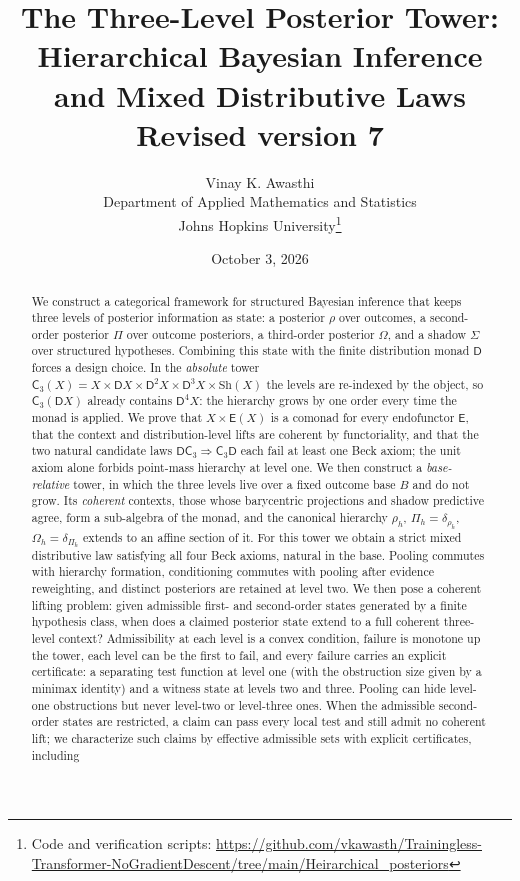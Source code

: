 \documentclass[11pt]{article}
\title{The Three-Level Posterior Tower:\\
Hierarchical Bayesian Inference and Mixed Distributive Laws\\[4pt]
\large Revised version 7}
\author{Vinay K. Awasthi\\
Department of Applied Mathematics and Statistics\\
Johns Hopkins University\thanks{Code and verification scripts:
\url{https://github.com/vkawasth/Trainingless-Transformer-NoGradientDescent/tree/main/Heirarchical_posteriors}}}
\date{October 3, 2026}
\theoremstyle{definition}
\theoremstyle{remark}
\newcommand{\D}{\mathsf{D}}
\newcommand{\Sh}{\mathrm{Sh}}
\newcommand{\C}{\mathsf{C}}
\newcommand{\E}{\mathsf{E}}
\begin{document}
\maketitle

\begin{abstract}
We construct a categorical framework for structured Bayesian inference that keeps three levels of
posterior information as state: a posterior $\rho$ over outcomes, a second-order posterior $\Pi$ over
outcome posteriors, a third-order posterior $\Omega$, and a shadow $\Sigma$ over structured hypotheses.
Combining this state with the finite distribution monad $\D$ forces a design choice. In the
\emph{absolute} tower $\C_3(X)=X\times\D X\times\D^2X\times\D^3X\times\Sh(X)$ the levels are
re-indexed by the object, so $\C_3(\D X)$ already contains $\D^4X$: the hierarchy grows by one order
every time the monad is applied. We prove that $X\times\E(X)$ is a comonad for every endofunctor $\E$,
that the context and distribution-level lifts are coherent by functoriality, and that the two natural
candidate laws $\D\C_3\Rightarrow\C_3\D$ each fail at least one Beck axiom; the unit axiom alone forbids
point-mass hierarchy at level one. We then construct a \emph{base-relative} tower, in which the three
levels live over a fixed outcome base $B$ and do not grow. Its \emph{coherent} contexts, those whose
barycentric projections and shadow predictive agree, form a sub-algebra of the monad, and the
canonical hierarchy $\rho_h$, $\Pi_h=\delta_{\rho_h}$, $\Omega_h=\delta_{\Pi_h}$ extends to an affine
section of it. For this tower we obtain a strict mixed distributive law satisfying all four Beck
axioms, natural in the base. Pooling commutes with hierarchy formation, conditioning commutes with
pooling after evidence reweighting, and distinct posteriors are retained at level two. We then pose a coherent lifting problem: given
admissible first- and second-order states generated by a finite hypothesis class, when does a claimed
posterior state extend to a full coherent three-level context? Admissibility at each level is a
convex condition, failure is monotone up the tower, each level can be the first to fail, and every
failure carries an explicit certificate: a separating test function at level one (with the obstruction
size given by a minimax identity) and a witness state at levels two and three. Pooling can hide
level-one obstructions but never level-two or level-three ones. When the admissible second-order
states are restricted, a claim can pass every local test and still admit no coherent lift; we
characterize such claims by effective admissible sets with explicit certificates, including

\end{abstract}
\end{document}
